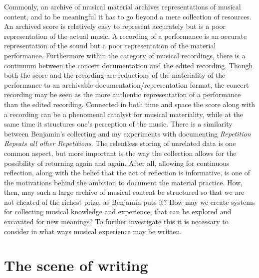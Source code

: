 \documentclass[11pt,a4paper]{article}
\begin{document}
Commonly, an archive of musical material archives representations of musical content, and to be meaningful it has to go beyond a mere collection of resources. An archived score is relatively easy to represent accurately but is a poor representation of the actual music. A recording of a performance is an accurate representation of the sound but a poor representation of the material performance. Furthermore within the category of musical recordings, there is a continuum between the concert documentation and the edited recording. Though both the score and the recording are reductions of the materiality of the performance to an archivable documentation/representation format, the concert recording may be seen as the more authentic representation of a performance than the edited recording. Connected in both time and space the score along with a recording can be a phenomenal catalyst for musical materiality, while at the same time it structures one's perception of the music.
There is a similarity between Benjamin's collecting and my experiments with documenting \emph{Repetition Repeats all other Repetitions}. The relentless storing of unrelated data is one common aspect, but more important is the way the collection allows for the possibility of returning again and again. After all, allowing for continuous reflection, along with the belief that the act of reflection is informative, is one of the motivations behind the ambition to document the material practice.
How, then, may such a large archive of musical content be structured so that we are not cheated of the richest prize, as Benjamin puts it? How may we create systems for collecting musical knowledge and experience, that can be explored and excavated for new meanings? To further investigate this it is necessary to consider in what ways musical experience may be written.





\section*{The scene of writing}
\label{sec:scene-writing}
\end{document}
